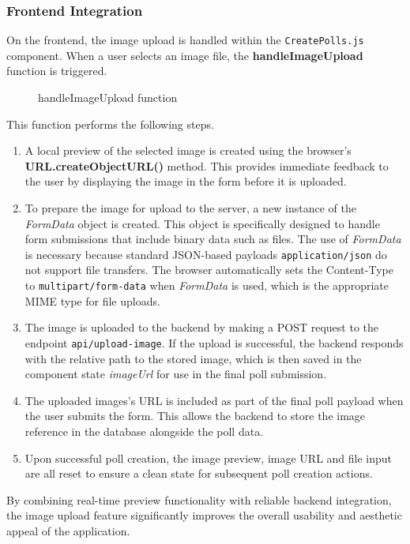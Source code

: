 \documentclass[a4paper,12pt]{report}
\begin{document}
\subsubsection{Frontend Integration}
On the frontend, the image upload is handled within the \texttt{CreatePolls.js} component. When a user selects an image file, the \textbf{handleImageUpload} function is triggered. 
\begin{figure}[H]
	\caption{handleImageUpload function}
	\label{fig:handleImageUpload}
\end{figure}
\noindent

This function performs the following steps.
\begin{enumerate}
	\item A local preview of the selected image is created using the browser's \textbf{URL.createObjectURL()} method. This provides immediate feedback to the user by displaying the image in the form before it is uploaded.
	\item To prepare the image for upload to the server, a new instance of the \textit{FormData} object is created. This object is specifically designed to handle form submissions that include binary data such as files. The use of \textit{FormData} is necessary because standard JSON-based payloads \texttt{application/json} do not support file transfers. The browser automatically sets the Content-Type to \texttt{multipart/form-data} when \textit{FormData} is used, which is the appropriate MIME type for file uploads.
	\item The image is uploaded to the backend by making a POST request to the endpoint \texttt{api/upload-image}. If the upload is successful, the backend responds with the relative path to the stored image, which is then saved in the component state \textit{imageUrl} for use in the final poll submission.
	\item The uploaded images's URL is included as part of the final poll payload when the user submits the form. This allows the backend to store the image reference in the database alongside the poll data.
	\item Upon successful poll creation, the image preview, image URL and file input are all reset to ensure a clean state for subsequent poll creation actions.
\end{enumerate}
By combining real-time preview functionality with reliable backend integration, the image upload feature significantly improves the overall usability and aesthetic appeal of the application. \\
\end{document}

